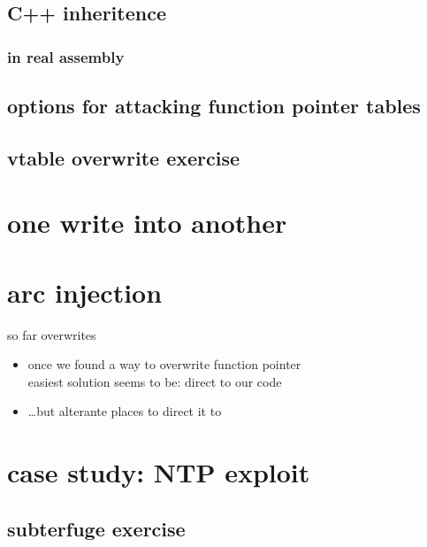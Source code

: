 \subsection{C++ inheritence}


\subsubsection{in real assembly}


\subsection{options for attacking function pointer tables}


\subsection{vtable overwrite exercise}





\section{one write into another}


\section{arc injection}
\begin{frame}{so far overwrites}
    \begin{itemize}
    \item once we found a way to overwrite function pointer\\
          easiest solution seems to be: direct to our code
    \item \ldots but alterante places to direct it to
    \end{itemize}
\end{frame}



\section{case study: NTP exploit}


\subsection{subterfuge exercise}

